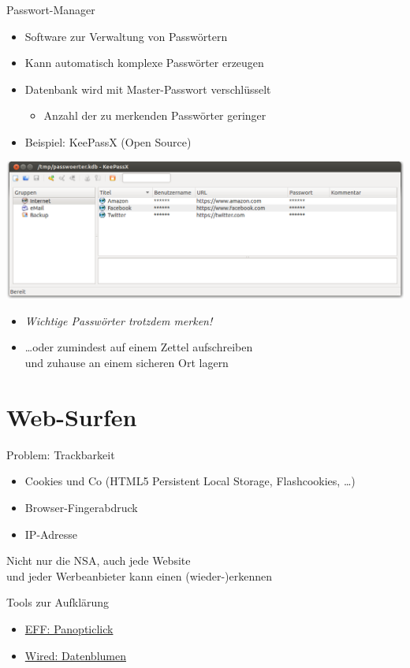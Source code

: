   \begin{frame}{Passwort-Manager}
    \begin{itemize}
      \item Software zur Verwaltung von Passwörtern
      \item Kann automatisch komplexe Passwörter erzeugen
      \item Datenbank wird mit Master-Passwort verschlüsselt
      \begin{itemize}
        \item Anzahl der zu merkenden Passwörter geringer
      \end{itemize}
      \item Beispiel: KeePassX (Open Source)
    \end{itemize}
      \includegraphics[width=\textwidth]{images/keepassx.png}
    \begin{itemize}
      \item \emph{Wichtige Passwörter trotzdem merken!}
      \item \ldots oder zumindest auf einem Zettel aufschreiben\\ und zuhause an einem sicheren Ort lagern
    \end{itemize}
  \end{frame}

\section{Web-Surfen}
  \begin{frame}{Problem: Trackbarkeit}
    \begin{itemize}
      \item Cookies und Co (HTML5 Persistent Local Storage, Flashcookies, \ldots)
      \item Browser-Fingerabdruck
      \item IP-Adresse
    \end{itemize}
    Nicht nur die NSA, auch jede Website\\ und jeder Werbeanbieter kann einen (wieder-)erkennen

    \begin{block}{Tools zur Aufklärung}
    \begin{itemize}
      \item \href{https://panopticlick.eff.org/}{EFF: Panopticlick}
      \item \href{http://datenblumen.wired.de/}{Wired: Datenblumen}
    \end{itemize}
    \end{block}
  \end{frame}

